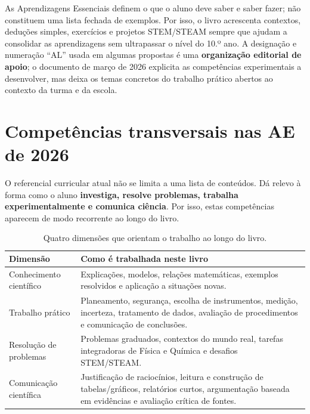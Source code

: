 \documentclass[11pt,a4paper,oneside]{book}
\begin{document}
\begin{nota}
As Aprendizagens Essenciais definem o que o aluno deve saber e saber fazer; não constituem uma lista fechada de exemplos. Por isso, o livro acrescenta contextos, deduções simples, exercícios e projetos STEM/STEAM sempre que ajudam a consolidar as aprendizagens sem ultrapassar o nível do 10.º ano. A designação e numeração ``AL'' usada em algumas propostas é uma \textbf{organização editorial de apoio}; o documento de março de 2026 explicita as competências experimentais a desenvolver, mas deixa os temas concretos do trabalho prático abertos ao contexto da turma e da escola.
\end{nota}

\chapter*{Competências transversais nas AE de 2026}
O referencial curricular atual não se limita a uma lista de conteúdos. Dá relevo à forma como o aluno \textbf{investiga, resolve problemas, trabalha experimentalmente e comunica ciência}. Por isso, estas competências aparecem de modo recorrente ao longo do livro.

\begin{table}[H]
\centering
\caption{Quatro dimensões que orientam o trabalho ao longo do livro.}
\renewcommand{\arraystretch}{1.18}\begin{tabularx}{\textwidth}{p{}X}
\toprule
Dimensão & Como é trabalhada neste livro \\
\midrule
Conhecimento científico & Explicações, modelos, relações matemáticas, exemplos resolvidos e aplicação a situações novas. \\
Trabalho prático & Planeamento, segurança, escolha de instrumentos, medição, incerteza, tratamento de dados, avaliação de procedimentos e comunicação de conclusões. \\
Resolução de problemas & Problemas graduados, contextos do mundo real, tarefas integradoras de Física e Química e desafios STEM/STEAM. \\
Comunicação científica & Justificação de raciocínios, leitura e construção de tabelas/gráficos, relatórios curtos, argumentação baseada em evidências e avaliação crítica de fontes. \\
\bottomrule
\end{tabularx}\renewcommand{\arraystretch}{1.0}
\end{table}
\end{document}
